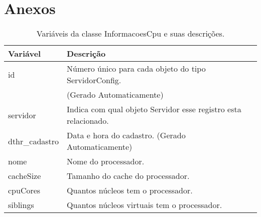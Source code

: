 
\chapter{Anexos} \label{App:ApendiceA}


\begin{table}[!ht]
\centering
\begin{tabular}{|l|l|}
\hline
{\color[HTML]{000000} \textbf{Variável}} & {\color[HTML]{000000} \textbf{Descrição}}                                      \\ \hline
id                                       & Número único para cada objeto do tipo ServidorConfig.\\ 
																				 &(Gerado Automaticamente) 																												\\ \hline
servidor                                 & Indica com qual objeto Servidor esse registro esta relacionado.                       \\ \hline
dthr\_cadastro                           & Data e hora do cadastro. (Gerado Automaticamente)                              \\ \hline
nome                                     & Nome do processador.                                                           \\ \hline
cacheSize                                & Tamanho do cache do processador.                                               \\ \hline
cpuCores                                 & Quantos núcleos tem o processador.                                             \\ \hline
siblings                                 & Quantos núcleos virtuais tem o processador.                                    \\ \hline
\end{tabular}
\caption[Variáveis da classe InformacoesCpu e suas descrições.]{Variáveis da classe InformacoesCpu e suas descrições.}
\label{Tab:VariaveisInformacoesCpu}
\end{table}



